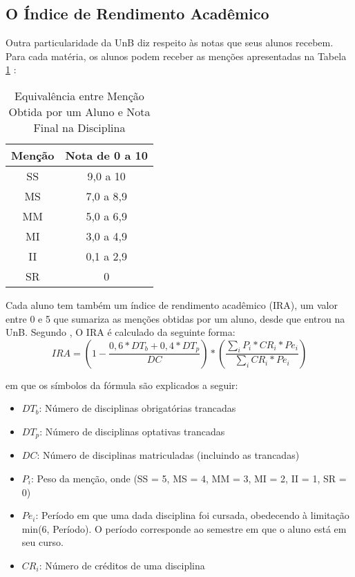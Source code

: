 \subsection{O Índice de Rendimento Acadêmico}
Outra particularidade da UnB diz respeito às notas que seus alunos recebem. Para cada
matéria, os alunos podem receber as menções apresentadas na Tabela \ref{mencao_unb} 
\cite{manual_calouro}: 

\begin{table}
\caption{Equivalência entre Menção Obtida por um Aluno e Nota Final na Disciplina}
\begin{center}
\begin{tabular}[c]{|c|c|}
    \hline
    \textbf{Menção} & \textbf{Nota de 0 a 10} \\
    \hline
    SS & 9,0 a 10 \\
    \hline
    MS & 7,0 a 8,9 \\
    \hline
    MM & 5,0 a 6,9 \\
    \hline
    MI & 3,0 a 4,9 \\
    \hline
    II & 0,1 a 2,9 \\
    \hline
    SR & 0 \\
    \hline
\end{tabular}
\end{center}
\label{mencao_unb}
\end{table}

Cada aluno tem também um índice de rendimento acadêmico (\acrshort{IRA}), um valor entre 0 e 5
que sumariza as menções obtidas por um aluno, desde que entrou na UnB. Segundo
\cite{manual_calouro}, O IRA é calculado da seguinte forma:  
\begin{equation}
    IRA = (1 - \frac{0,6 * DT_b + 0,4 * DT_p}{DC}) * 
    (\frac{\sum_{i}P_i * CR_i * Pe_i}{\sum_{i} CR_i * Pe_i})
\end{equation}

em que os símbolos da fórmula são explicados a seguir: 
\begin{itemize}
    \item $DT_b$: Número de disciplinas obrigatórias trancadas
    \item $DT_p$: Número de disciplinas optativas trancadas
    \item $DC$: Número de disciplinas matriculadas (incluindo as trancadas)
    \item $P_i$: Peso da menção, onde (SS = 5, MS = 4, MM = 3, MI = 2, II = 1, SR =
        0)
    \item $Pe_i$: Período em que uma dada disciplina foi cursada, obedecendo à
        limitação min(6, Período). O período corresponde ao semestre em que o aluno
        está em seu curso. 
    \item $CR_i$: Número de créditos de uma disciplina
\end{itemize}

